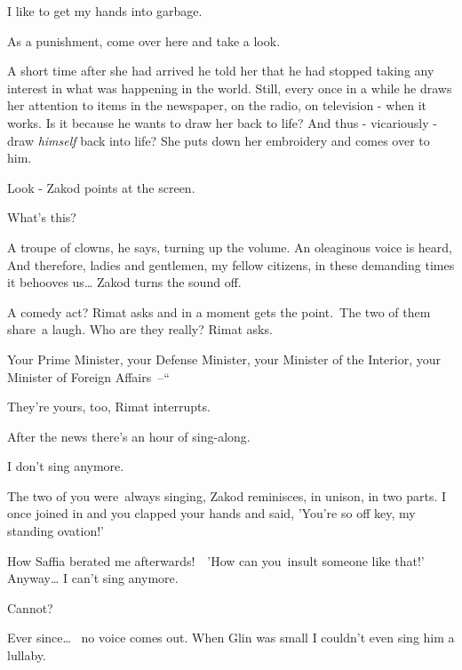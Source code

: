 \documentclass[twoside,11pt]{book}
\begin{document}
{\textquotedbl}I like to get my hands into garbage.{\textquotedbl} 

{\textquotedbl}As a punishment, come over here and take a look.{\textquotedbl}

A short time after she had arrived he told her that he had stopped taking any interest in what was happening in the
world. Still, every once in a while he draws her attention to items in the newspaper, on the radio, on television -
when it works. Is it because he wants to draw her back to life? And thus - vicariously - draw \textit{himself} back
into life? She puts down her embroidery and comes over to him. 

{\textquotedbl}Look -{\textquotedbl} Zakod points at the screen. 

{\textquotedbl}What's this?{\textquotedbl} 

{\textquotedbl}A troupe of clowns,{\textquotedbl} he says, turning up the volume. An oleaginous voice is heard,
{\textquotedbl}And therefore, ladies and gentlemen, my fellow citizens, in these demanding times it behooves
us{\dots}{\textquotedbl} Zakod turns the sound off. \ 

{\textquotedbl}A comedy act?{\textquotedbl} Rimat asks and in a moment gets the point.~The two of them share~a laugh.
{\textquotedbl}Who are they really?{\textquotedbl} Rimat asks. 

{\textquotedbl}Your Prime Minister, your Defense Minister, your Minister of the Interior, your Minister of Foreign
Affairs\ {}--``

{\textquotedbl}They're yours, too,{\textquotedbl} Rimat interrupts.

{\textquotedbl}After the news there's an hour of sing-along.{\textquotedbl} 

{\textquotedbl}I don't sing anymore.{\textquotedbl} 

{\textquotedbl}The two of you were~always singing,{\textquotedbl} Zakod reminisces, {\textquotedbl}in unison, in two
parts. I once joined in and you clapped your hands and said, 'You're so off key, my standing ovation!'{\textquotedbl} 

{\textquotedbl}How Saffia berated me afterwards!\ \ {}'How can you~insult someone like that!' Anyway{\dots} I can't sing
anymore.{\textquotedbl} 

{\textquotedbl}Cannot?{\textquotedbl} 

{\textquotedbl}Ever since{\dots} ~no voice comes out. When Glin was small I couldn't even sing him a
lullaby.{\textquotedbl} 
\end{document}
